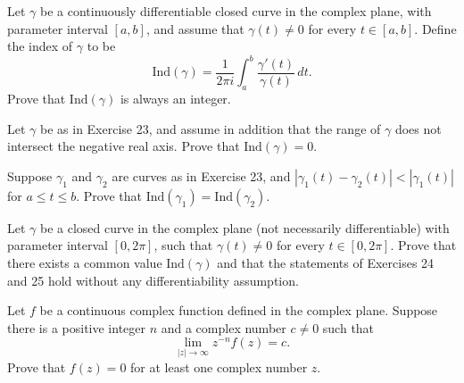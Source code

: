   \begin{exercise}[Rudin 8.23]
    Let $\gamma$ be a continuously differentiable closed curve in the complex plane, with parameter interval $[a, b]$, and assume that $\gamma(t) \neq 0$ for every $t \in [a, b]$. Define the index of $\gamma$ to be
    \begin{equation}
      \text{Ind} (\gamma) = \frac{1}{2\pi i} \int_a^b \frac{\gamma'(t)}{\gamma(t)} \, dt.
    \end{equation}
    Prove that $\text{Ind} (\gamma)$ is always an integer.
  \end{exercise}
  \begin{solution}

  \end{solution}

  \begin{exercise}[Rudin 8.24]
    Let $\gamma$ be as in Exercise 23, and assume in addition that the range of $\gamma$ does not intersect the negative real axis. Prove that $\text{Ind} (\gamma) = 0$.
  \end{exercise}
  \begin{solution}

  \end{solution}

  \begin{exercise}[Rudin 8.25]
    Suppose $\gamma_1$ and $\gamma_2$ are curves as in Exercise 23, and $|\gamma_1(t) - \gamma_2(t)| < |\gamma_1(t)|$ for $a \leq t \leq b$. Prove that $\text{Ind} (\gamma_1) = \text{Ind} (\gamma_2)$.
  \end{exercise}
  \begin{solution}

  \end{solution}

  \begin{exercise}[Rudin 8.26]
    Let $\gamma$ be a closed curve in the complex plane (not necessarily differentiable) with parameter interval $[0, 2\pi]$, such that $\gamma(t) \neq 0$ for every $t \in [0, 2\pi]$. Prove that there exists a common value $\text{Ind} (\gamma)$ and that the statements of Exercises 24 and 25 hold without any differentiability assumption.
  \end{exercise}
  \begin{solution}

  \end{solution}

  \begin{exercise}[Rudin 8.27]
    Let $f$ be a continuous complex function defined in the complex plane. Suppose there is a positive integer $n$ and a complex number $c \neq 0$ such that
    \begin{equation}
      \lim_{|z| \to \infty} z^{-n} f(z) = c.
    \end{equation}
    Prove that $f(z) = 0$ for at least one complex number $z$.
  \end{exercise}
  \begin{solution}

  \end{solution}

